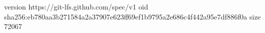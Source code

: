 version https://git-lfs.github.com/spec/v1
oid sha256:eb780aa3b271584a2a37907e623ff69ef1b9795a2e686c4f442a95e7df886f0a
size 72067
